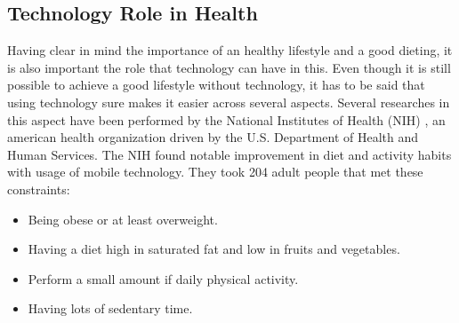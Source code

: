 \subsection{Technology Role in Health}
Having clear in mind the importance of an healthy lifestyle and a good dieting, it is also important the role that technology can have in this. Even though it is still possible to achieve a good lifestyle without technology, it has to be said that using technology sure makes it easier across several aspects. Several researches in this aspect have been performed by the National Institutes of Health (NIH) \cite{Nih}, an american health organization driven by the U.S. Department of Health and Human Services. The NIH found notable improvement in diet and activity habits with usage of mobile technology. \newline They took 204 adult people that met these constraints: 
\vspace{2ex}
\begin{itemize}[nosep] %
    \item Being obese or at least overweight.\vspace{2ex}
    \item Having a diet high in saturated fat and low in fruits and vegetables.\vspace{2ex}
    \item Perform a small amount if daily physical activity.\vspace{2ex}
    \item Having lots of sedentary time.\vspace{2ex}
\end{itemize}
